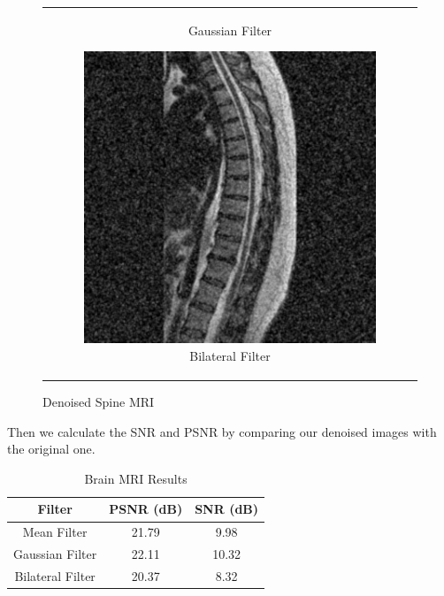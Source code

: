 \documentclass[hidelinks,12pt]{article}
\begin{document}
\begin{figure}[!h]
\begin{tabular}{c}
\begin{subfigure}[h]{0.3\textwidth}
				\caption{Gaussian Filter}
			\end{subfigure}
			\hfill
			\begin{subfigure}[h]{0.3\textwidth}
				\centering
				\includegraphics[width=\textwidth]{figures/spine_mri/bilateral.jpg}
				\caption{Bilateral Filter}
			\end{subfigure}
		\end{tabular}
		\caption{Denoised Spine MRI}
	\end{figure}
	
	Then we calculate the SNR and PSNR by comparing our denoised images with the original one.
	
	\begin{table}[h!]
		\centering
		\begin{tabular}{|c|c|c|}
			\hline
			\textbf{Filter}       & \textbf{PSNR (dB)} & \textbf{SNR (dB)} \\
			\hline
			Mean Filter           & 21.79              & 9.98              \\
			Gaussian Filter       & 22.11              & 10.32             \\
			Bilateral Filter      & 20.37              & 8.32              \\
			\hline
		\end{tabular}
		\caption{Brain MRI Results}
	\end{table}
	
\end{document}
